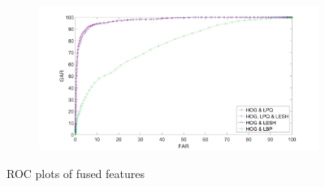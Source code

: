 \documentclass[english, 12pt]{article}
\begin{document}
\begin{figure}[H]
    \centering
    \begin{subfigure}[b]{1\textwidth}
		\includegraphics[width=\textwidth]{rocfusion.jpg}
	\end{subfigure}
	\centering
    \caption{ROC plots of fused features}\label{fig:crocf}
\end{figure}
\end{document}
